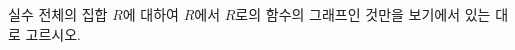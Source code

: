 \hspace*{2mm}\begin{minipage}[t]{\dimexpr\linewidth-2mm\relax}\vspace{0pt}
실수 전체의 집합 $R$에 대하여 $R$에서 $R$로의 함수의 그래프인 것만을 보기에서 있는 대로 고르시오.
\par\smallskip\begin{center}\resizebox{\ifdim\width>\linewidth\linewidth\else\width\fi}{!}{}\end{center}\end{minipage}

